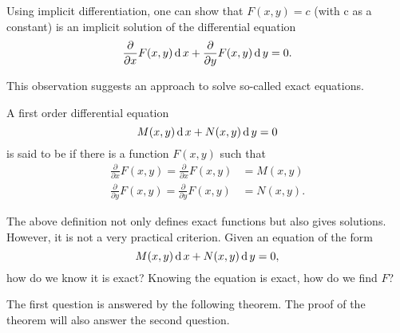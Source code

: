 Using implicit differentiation, one can show that $F(x, y)=c$ (with  c  as a constant) is an implicit solution of the differential equation
\[\frac{\partial}{\partial x} F(x,y)\operatorname{d} x +\frac{\partial}{\partial y} F(x, y)\operatorname{d} y=0.\]

This observation suggests an approach to solve so-called exact equations. 

\begin{definition}
  A first order differential equation 
  \[M(x,y)\operatorname{d} x+N(x,y)\operatorname{d} y=0\]
  is said to be  if there is a function $F(x, y)$ such that 
\[
\begin{aligned}
\frac{\partial}{\partial x} F(x,y)=\frac{\partial}{\partial x}F(x, y)&=M(x,y)\\
\frac{\partial}{\partial y} F(x,y)=\frac{\partial}{\partial y}F(x, y)&=N(x,y).
\end{aligned}
\]
\end{definition}

The above definition not only defines exact functions but also gives solutions. However, it is not a very practical criterion. Given an equation of the form
\[M(x,y) \operatorname{d} x +  N(x,y) \operatorname{d} y=0,\]
how do we know it is exact? Knowing the equation is exact, how do we find $F$?

The first question is answered by the following theorem. The proof of the theorem will also answer the second question.

